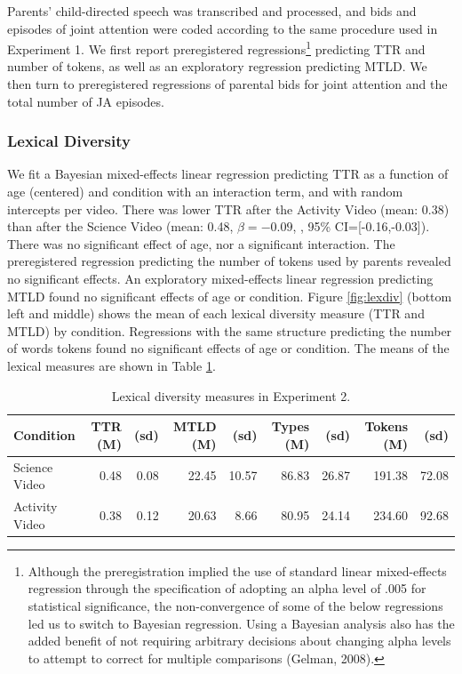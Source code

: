 \documentclass[man,floatsintext]{apa6}
\let\rmarkdownfootnote\footnote%
\def\footnote{\protect\rmarkdownfootnote}
\begin{document}
Parents' child-directed speech was transcribed and processed, and bids and episodes of joint attention were coded according to the same procedure used in Experiment 1.
We first report preregistered regressions\footnote{Although the preregistration implied the use of standard linear mixed-effects regression through the specification of adopting an alpha level of .005 for statistical significance, the non-convergence of some of the below regressions led us to switch to Bayesian regression. Using a Bayesian analysis also has the added benefit of not requiring arbitrary decisions about changing alpha levels to attempt to correct for multiple comparisons (Gelman, 2008).} predicting TTR and number of tokens, as well as an exploratory regression predicting MTLD.
We then turn to preregistered regressions of parental bids for joint attention and the total number of JA episodes.

\hypertarget{lexical-diversity-1}{%
\subsubsection{Lexical Diversity}\label{lexical-diversity-1}}

We fit a Bayesian mixed-effects linear regression predicting TTR as a function of age (centered) and condition with an interaction term, and with random intercepts per video.
There was lower TTR after the Activity Video (mean: 0.38) than after the Science Video (mean: 0.48, \(\beta=-0.09\), , 95\% CI={[}-0.16,-0.03{]}).
There was no significant effect of age, nor a significant interaction.
The preregistered regression predicting the number of tokens used by parents revealed no significant effects.
An exploratory mixed-effects linear regression predicting MTLD found no significant effects of age or condition.
Figure \ref{fig:lexdiv} (bottom left and middle) shows the mean of each lexical diversity measure (TTR and MTLD) by condition.
Regressions with the same structure predicting the number of words tokens found no significant effects of age or condition.
The means of the lexical measures are shown in Table \ref{e2tab}.

\begin{table}[t]

\caption{\label{tab:e2tab}\label{e2tab} Lexical diversity measures in Experiment 2.}
\centering
\begin{tabular}{l|r|r|r|r|r|r|r|r}
\hline
Condition & TTR (M) & (sd) & MTLD (M) & (sd) & Types (M) & (sd) & Tokens (M) & (sd)\\
\hline
Science Video & 0.48 & 0.08 & 22.45 & 10.57 & 86.83 & 26.87 & 191.38 & 72.08\\
\hline
Activity Video & 0.38 & 0.12 & 20.63 & 8.66 & 80.95 & 24.14 & 234.60 & 92.68\\
\hline
\end{tabular}
\end{table}
\end{document}
